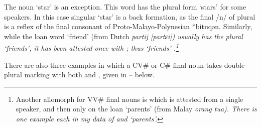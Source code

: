 \begin{exe}
	\label{ex:pl->=n/VVnoun}
\end{exe}

The noun  `star' is an exception.
This word has the plural form  `stars' for some speakers.
In this case singular  `star' is a back formation,
as the final /n/ of plural  is a reflex
of the final consonant of Proto-Malayo-Polynesian *bituqən.
Similarly, while the loan word  `friend'
(from Dutch \it{partij} [partɛi]) usually has the plural
 `friends', it has been attested once
with ; thus  `friends' \citep[3]{or16}.\footnote{
		Another allomorph for VV{\#} final nouns
		is  which is attested
		from a single speaker, and then only on the loan  `parents'
		(from Malay \it{orang tua}).
		There is one example each in my data of 
		and  `parents'.}

There are also three examples in which
a CV{\#} or C{\#} final noun takes double plural marking
with both  and ,
given in -- below.

